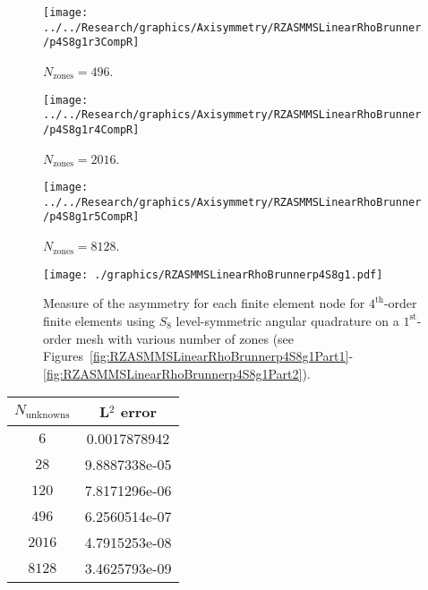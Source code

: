 \documentclass[12pt]{article}
\begin{document}
\begin{sidewaysfigure}[!htb]
\centering
\begin{subfigure}{0.33\textwidth}
\texttt{[image: ../../Research/graphics/Axisymmetry/RZASMMSLinearRhoBrunner/p4S8g1r3CompR]}
\caption{$N_\text{zones}=496$.}
\end{subfigure}%
\begin{subfigure}{0.33\textwidth}
\texttt{[image: ../../Research/graphics/Axisymmetry/RZASMMSLinearRhoBrunner/p4S8g1r4CompR]}
\caption{$N_\text{zones}=2016$.}
\end{subfigure}%
\begin{subfigure}{0.33\textwidth}
\texttt{[image: ../../Research/graphics/Axisymmetry/RZASMMSLinearRhoBrunner/p4S8g1r5CompR]}
\caption{$N_\text{zones}=8128$.}
\end{subfigure}
\caption{Relative asymmetry for $p=4$ finite elements on a $1^\text{st}$-order mesh for $S_8$ level-symmetric angular quadrature for $N_\text{zones}=\{496,2016,8128\}$; mesh overlay may be removed for clarity.}
\label{fig:RZASMMSLinearRhoBrunnerp4S8g1Part2}
\end{sidewaysfigure}

\begin{figure}[!htb]
\centering
\texttt{[image: ./graphics/RZASMMSLinearRhoBrunnerp4S8g1.pdf]}
\caption{Measure of the asymmetry for each finite element node for $4^\text{th}$-order finite elements using $S_8$ level-symmetric angular quadrature on a $1^\text{st}$-order mesh with various number of zones (see Figures~\ref{fig:RZASMMSLinearRhoBrunnerp4S8g1Part1}-\ref{fig:RZASMMSLinearRhoBrunnerp4S8g1Part2}).}
\label{fig:RZASMMSLinearRhoBrunnerp4S8g1Nodes}
\end{figure}

\begin{table}[!htb]
\centering
{\renewcommand{\arraystretch}{1.5}
\begin{tabular}{|c|c|}
\hline
$N_\text{unknowns}$ & L$^2$ error \\\hline
$6$ & 0.0017878942 \\\hline
$28$ & 9.8887338e-05 \\\hline
$120$ & 7.8171296e-06 \\\hline
$496$ & 6.2560514e-07 \\\hline
$2016$ & 4.7915253e-08 \\\hline
$8128$ & 3.4625793e-09 \\\hline
\end{tabular}}
\end{table}
\end{document}
